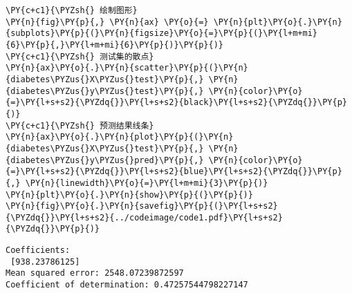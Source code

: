\begin{Verbatim}[commandchars=\\\{\}]
\PY{c+c1}{\PYZsh{} 绘制图形}
\PY{n}{fig}\PY{p}{,} \PY{n}{ax} \PY{o}{=} \PY{n}{plt}\PY{o}{.}\PY{n}{subplots}\PY{p}{(}\PY{n}{figsize}\PY{o}{=}\PY{p}{(}\PY{l+m+mi}{6}\PY{p}{,}\PY{l+m+mi}{6}\PY{p}{)}\PY{p}{)}
\PY{c+c1}{\PYZsh{} 测试集的散点}
\PY{n}{ax}\PY{o}{.}\PY{n}{scatter}\PY{p}{(}\PY{n}{diabetes\PYZus{}X\PYZus{}test}\PY{p}{,} \PY{n}{diabetes\PYZus{}y\PYZus{}test}\PY{p}{,} \PY{n}{color}\PY{o}{=}\PY{l+s+s2}{\PYZdq{}}\PY{l+s+s2}{black}\PY{l+s+s2}{\PYZdq{}}\PY{p}{)}
\PY{c+c1}{\PYZsh{} 预测结果线条}
\PY{n}{ax}\PY{o}{.}\PY{n}{plot}\PY{p}{(}\PY{n}{diabetes\PYZus{}X\PYZus{}test}\PY{p}{,} \PY{n}{diabetes\PYZus{}y\PYZus{}pred}\PY{p}{,} \PY{n}{color}\PY{o}{=}\PY{l+s+s2}{\PYZdq{}}\PY{l+s+s2}{blue}\PY{l+s+s2}{\PYZdq{}}\PY{p}{,} \PY{n}{linewidth}\PY{o}{=}\PY{l+m+mi}{3}\PY{p}{)}
\PY{n}{plt}\PY{o}{.}\PY{n}{show}\PY{p}{(}\PY{p}{)}
\PY{n}{fig}\PY{o}{.}\PY{n}{savefig}\PY{p}{(}\PY{l+s+s2}{\PYZdq{}}\PY{l+s+s2}{../codeimage/code1.pdf}\PY{l+s+s2}{\PYZdq{}}\PY{p}{)}
\end{Verbatim}

\begin{Verbatim}[commandchars=\\\{\}]
Coefficients:
 [938.23786125]
Mean squared error: 2548.07239872597
Coefficient of determination: 0.47257544798227147
\end{Verbatim}
